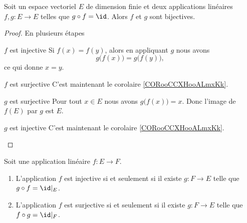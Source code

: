 \begin{proposition}     \label{PROPooADESooATJSrH}
	Soit un espace vectoriel \( E\) de dimension finie et deux applications linéaires \( f,g\colon E\to E\) telles que \( g\circ f=\id\). Alors \( f\) et \( g\) sont bijectives.
\end{proposition}

\begin{proof}
	En plusieurs étapes
	\begin{subproof}
		\item[\( f\) est injective]
		Si \( f(x)=f(y)\), alors en appliquant \( g\) nous avons
		\begin{equation}
			g\big( f(x) \big)=g\big( f(y) \big),
		\end{equation}
		ce qui donne \( x=y\).
		\item[\( f\) est surjective]
		C'est maintenant le corolaire \ref{CORooCCXHooALmxKk}.
		\item[\( g\) est surjective]
		Pour tout \( x\in E\) nous avons \( g\big( f(x) \big)=x\). Donc l'image de \( f(E)\) par \( g\) est $E$.
		\item[\( g\) est injective]
		C'est maintenant le corolaire \ref{CORooCCXHooALmxKk}.
	\end{subproof}
\end{proof}

\begin{lemma}        \label{LEMooDAACooElDsYb}
	Soit une application linéaire \( f\colon E\to F\).
	\begin{enumerate}
		\item       \label{ITEMooEZEWooZGoqsZ}
		      L'application \( f\) est injective si et seulement si il existe \( g\colon F\to E\) telle que \( g\circ f=\id|_E\).
		\item
		      L'application \( f\) est surjective si et seulement si il existe \( g\colon F\to E\) telle que \( f\circ g=\id|_F\).
	\end{enumerate}
\end{lemma}

